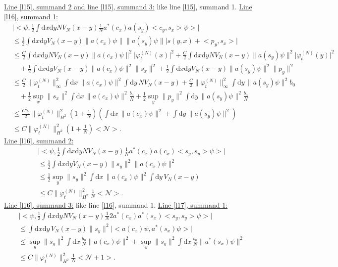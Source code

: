 \documentclass[11pt,a4paper,draft,DIV11]{scrartcl}	%
\newcommand{\di}{\textrm{d}}		%
\newcommand{\Ncal}{\mathcal{N}}		%
\newcommand{\estlist}[2]{\underline{Line \ref{l#1}, summand #2:}}
\newcommand{\nestlist}[2]{line \ref{l#1}, summand #2}
\newcommand{\Nestlist}[2]{Line \ref{l#1}, summand #2}
\newcommand{\scal}[2]{\big<#1,#2\big>} %
\newcommand{\norm}[1]{\lVert#1\rVert}	%
\newcommand{\ev}[1]{\big<#1\big>}	%
\newcommand{\ph}{\varphi_t^{(N)}}	%
\newcommand{\dxyNV}{\frac{1}{2}\int \di x\di y N V_N(x-y)} %
\newcommand{\dxyV}{\frac{1}{2}\int \di x\di y V_N(x-y)} %
\begin{document}
\underline{\Nestlist{15}{2} and \nestlist{15}{3}:} like \nestlist{15}{1}.\newline
\estlist{16}{1}
\begin{align*}
& \lvert \scal{\psi}{\dxyNV \frac{1}{N}a^\ast(c_x) a(s_y) \scal{c_y}{s_x}\psi} \rvert \\
& \leq \dxyV \norm{a(c_x)\psi} \norm{a(s_y)\psi} \lvert s(y,x)+\scal{p_y}{s_x} \rvert \\
& \leq \frac{C}{2}\int \di x\di y N V_N(x-y) \norm{a(c_x)\psi}^2 \lvert \ph(x)\rvert^2 + \frac{C}{2}\int \di x\di y N V_N(x-y) \norm{a(s_y)\psi}^2 \lvert \ph(y)\rvert^2\\
& \quad + \dxyV \norm{a(c_x)\psi}^2 \norm{s_x}^2 + \dxyV \norm{a(s_y)\psi}^2 \norm{p_y}^2 \\
& \leq \frac{C}{2} \norm{\ph}_\infty^2 \int \di x\, \norm{a(c_x)\psi}^2 \int \di y\, NV_N(x-y) + \frac{C}{2} \norm{\ph}_\infty^2 \int \di y\, \norm{a(s_y)\psi}^2 b_0 \\
& \quad + \frac{1}{2}\sup_x\norm{s_x}^2 \int \di x\, \norm{a(c_x)\psi}^2 \frac{b_0}{N} + \frac{1}{2} \sup_y \norm{p_y}^2 \int \di y\, \norm{a(s_y)\psi}^2 \frac{b_0}{N} \\
& \leq \frac{C b_0}{2} \norm{\ph}_{H^2}^2 \left(1+\frac{1}{N}\right) \left( \int \di x\,\norm{a(c_x)\psi}^2 + \int \di y\,\norm{a(s_y)\psi}^2 \right) \\
& \leq C\norm{\ph}_{H^2}^2 \left(1+\frac{1}{N}\right)\ev{\Ncal}.
\end{align*}
\estlist{16}{2}
\begin{align*}
& \lvert \scal{\psi}{\dxyNV \frac{1}{N} a^\ast(c_x) a(c_x)\scal{s_y}{s_y}\psi} \rvert \\
& \leq \dxyV \norm{s_y}^2 \norm{a(c_x)\psi}^2 \\
& \leq \frac{1}{2} \sup_y \norm{s_y}^2 \int \di x\, \norm{a(c_x)\psi}^2 \int \di y\, V_N(x-y) \\
& \leq C\norm{\ph}_{H^2}^2 \frac{1}{N}\ev{\Ncal}.
\end{align*}
\underline{\Nestlist{16}{3}:} like \nestlist{16}{1}.\newline
\estlist{17}{1}
\begin{align*}
 & \lvert \scal{\psi}{\dxyNV \frac{1}{N}2 a^\ast(c_x)a^\ast(s_x) \scal{s_y}{s_y}\psi} \rvert \\
& \leq \int \di x\di y\, V_N(x-y) \norm{s_y}^2 \lvert \scal{a(c_x)\psi}{a^\ast(s_x)\psi}\rvert \\
& \leq \sup_y \norm{s_y}^2 \int \di x\, \frac{b_0}{N} \norm{a(c_x)\psi}^2 + \sup_y \norm{s_y}^2 \int \di x\, \frac{b_0}{N} \norm{a^\ast(s_x)\psi}^2 \\
& \leq C \norm{\ph}_{H^2}^2 \frac{1}{N}\ev{\Ncal+1}.
\end{align*}
\end{document}
